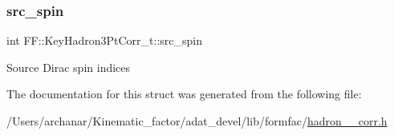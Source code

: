 \subsubsection{\texorpdfstring{src\_spin}{src\_spin}}
{\footnotesize\ttfamily int F\+F\+::\+Key\+Hadron3\+Pt\+Corr\+\_\+t\+::src\+\_\+spin}

Source Dirac spin indices 

The documentation for this struct was generated from the following file\+:\begin{DoxyCompactItemize}
\item 
/\+Users/archanar/\+Kinematic\+\_\+factor/adat\+\_\+devel/lib/formfac/\mbox{\hyperlink{lib_2formfac_2hadron__3pt__corr_8h}{hadron\+\_\+3pt\+\_\+corr.\+h}}\end{DoxyCompactItemize}
